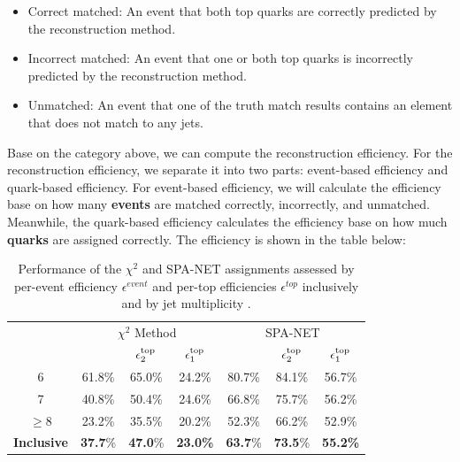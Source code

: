 \begin{itemize}
	\item Correct matched: An event that both top quarks are correctly predicted by the reconstruction method.
	\item Incorrect matched: An event that one or both top quarks is incorrectly predicted by the reconstruction method.
	\item Unmatched: An event that one of the truth match results contains an element that does not match to any jets.
\end{itemize}
Base on the category above, we can compute the reconstruction efficiency. For the reconstruction efficiency, we separate it into two parts: event-based efficiency and quark-based efficiency. For event-based efficiency, we will calculate the efficiency base on how many \textbf{events} are matched correctly, incorrectly, and unmatched. Meanwhile, the quark-based efficiency calculates the efficiency base on how much \textbf{quarks} are assigned correctly. The efficiency is shown in the table below:
\begin{table}[H]
	\caption{ Performance of the $\chi^2$ and SPA-NET assignments assessed by per-event efficiency $\epsilon^{event}$ and per-top efficiencies $\epsilon^{top}$ inclusively and by jet multiplicity \Njets. %
	}
	\centering
	\begin{tabular}{c c  c  c  c c  c}
		\hline
		\hline
		& \multicolumn{3}{c}{$\chi^2$ Method} & \multicolumn{3}{c}{SPA-NET }\\
		\hspace{0.2cm}\Njets & \hspace{0.15cm} \epsevent & $\epsilon^\mathrm{top}_2$ & \hspace{0.15cm} $\epsilon^\mathrm{top}_1$ \hspace{0.15cm} & \hspace{0.15cm} \epsevent & $\epsilon^\mathrm{top}_2$ & \hspace{0.15cm} $\epsilon^\mathrm{top}_1$ \hspace{0.15cm}   \\
		\midrule
		6          & 61.8\% & 65.0\% & 24.2\% & 80.7\% & 84.1\% & 56.7\% \\
		7          & 40.8\% & 50.4\% & 24.6\% & 66.8\% & 75.7\% & 56.2\% \\
		$\geq$8    & 23.2\% & 35.5\% & 20.2\% & 52.3\% & 66.2\% & 52.9\% \\
		\midrule     
		\vspace{0.2cm}
		\textbf{Inclusive}  &\textbf{ 37.7}\% & \textbf{47.0}\% & \textbf{23.0\%} & \textbf{63.7}\% &\textbf{73.5}\% &\textbf{55.2\%} \\
		\hline
	\end{tabular}
	
	\label{tab:eps}
\end{table}

